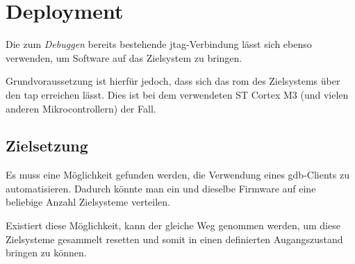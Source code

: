 \section{Deployment}
Die zum \emph{Debuggen} bereits bestehende \gls{jtag}-Verbindung lässt sich
ebenso verwenden, um Software auf das Zielsystem zu bringen.

Grundvoraussetzung ist hierfür jedoch, dass sich das \gls{rom} des Zielsystems
über den \gls{tap} erreichen lässt. Dies ist bei dem verwendeten ST Cortex M3
(und vielen anderen Mikrocontrollern) der Fall.
\subsection{Zielsetzung}
Es muss eine Möglichkeit gefunden werden, die Verwendung eines \gls{gdb}-Clients
zu automatisieren. Dadurch könnte man ein und dieselbe Firmware auf eine
beliebige Anzahl Zielsysteme verteilen.

Existiert diese Möglichkeit, kann der gleiche Weg genommen werden, um diese
Zielsysteme gesammelt resetten und somit in einen definierten Augangszustand
bringen zu können.

